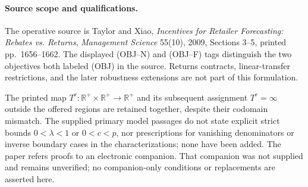\documentclass{article}
\begin{document}
\paragraph{Source scope and qualifications.}
The operative source is Taylor and Xiao, \emph{Incentives for Retailer Forecasting: Rebates vs. Returns}, \emph{Management Science} 55(10), 2009, Sections 3--5, printed pp.~1656--1662. The displayed (OBJ--N) and (OBJ--F) tags distinguish the two objectives both labeled (OBJ) in the source. Returns contracts, linear-transfer restrictions, and the later robustness extensions are not part of this formulation.

The printed map $T^r:\mathbb R^+\times\mathbb R^+\to\mathbb R^+$ and its subsequent assignment $T^r=\infty$ outside the offered regions are retained together, despite their codomain mismatch. The supplied primary model passages do not state explicit strict bounds $0<\lambda<1$ or $0<c<p$, nor prescriptions for vanishing denominators or inverse boundary cases in the characterizations; none have been added. The paper refers proofs to an electronic companion. That companion was not supplied and remains unverified; no companion-only conditions or replacements are asserted here.
\end{document}

